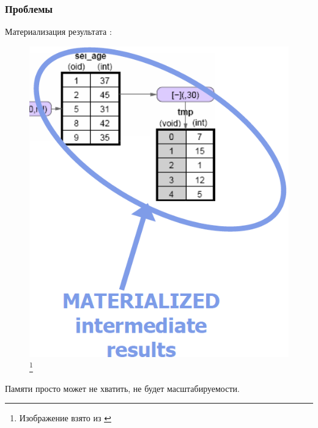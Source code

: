 \documentclass{beamer}
\begin{document}
\begin{frame}
\frametitle{Проблемы}

Материализация результата \cite{Boncz2008, Harizopoulos2009}:

\begin{figure}[htb]
\includegraphics[width=\textwidth,height=0.50\textheight,keepaspectratio]{problems.png} 
\footnote{\tiny{Изображение взято из \cite{Harizopoulos2009}}}
\end{figure}

Памяти просто может не хватить, не будет масштабируемости.
\end{frame}
\end{document}

